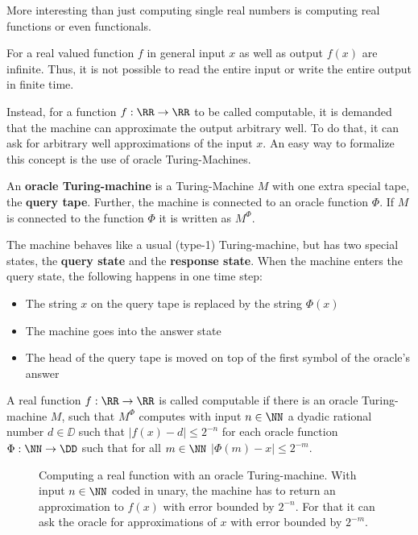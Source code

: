More interesting than just computing single real numbers is computing real
functions or even functionals.

For a real valued function $f$ in general input $x$ as well as
output $f(x)$ are infinite. 
Thus, it is not possible to read the entire input or write the entire output in
finite time.

Instead, for a function $f: \RR \to \RR$ to be called computable, it is
demanded that the machine can approximate the output arbitrary well.
To do that, it can ask for arbitrary well approximations of the input $x$.
An easy way to formalize this concept is the use of oracle Turing-Machines.
\begin{definition}\label{def:computability_oracle_tm}
 An \textbf{oracle Turing-machine} is a Turing-Machine $M$ with one extra special
 tape, the \textbf{query tape}. Further, the machine is connected to an oracle
 function $\Phi$.
 If $M$ is connected to the function $\Phi$ it is written as $M^\Phi$. 

 The machine behaves like a usual (type-1) Turing-machine, but has two special
 states, the \textbf{query state} and the \textbf{response state}. 
 When the machine enters the query state, the following happens in one time
 step: 
 \begin{itemize}
    \item The string $x$ on the query tape is replaced by the string $\Phi(x)$
    \item The machine goes into the answer state
    \item The head of the query tape is moved on top of the first symbol of the
      oracle's answer
  \end{itemize}

 A real function $f: \RR \to \RR$ is called computable if there is an oracle
 Turing-machine $M$, such that $M^\Phi$ computes with input $n \in \NN$ a dyadic rational
 number $d \in \DD$ such that $| f(x) - d | \leq 2^{-n}$ for each oracle function
 $\Phi: \NN \to \DD$ such that for all $m \in \NN$ $|\Phi(m) - x| \leq 2^{-m}$.   
\end{definition}
\begin{figure}
  \centering
  
  \caption{Computing a real function with an oracle Turing-machine. With input
  $n \in \NN$ coded in unary, the machine has to return an approximation to
  $f(x)$ with error bounded by $2^{-n}$. For that it can ask the oracle for
  approximations of $x$ with error bounded by $2^{-m}$.
  }
\end{figure}
